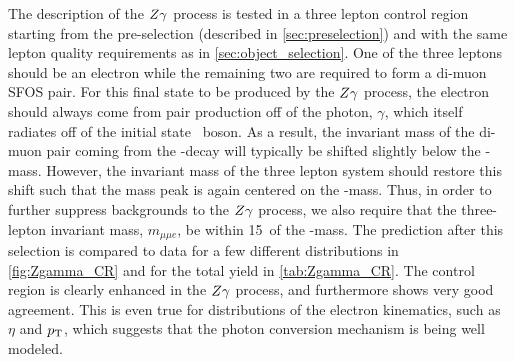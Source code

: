 The description of the $Z\gamma$ process is tested in a three lepton control
region starting from the 
pre-selection (described in \sec\ref{sec:preselection}) and with the same
lepton quality requirements as in \sec\ref{sec:object_selection}.
One of the three leptons should be an electron while the remaining two 
are required to form a di-muon SFOS pair. For this final state to be produced
by the $Z\gamma$ process, the electron should always come from 
pair production off of the photon, $\gamma$, which itself radiates
off of the initial state \z~boson.  As a result, the invariant mass
of the di-muon pair coming from the \z-decay will typically be shifted
slightly below the \z-mass. However, the invariant mass of the three lepton 
system should restore this shift such that the mass peak is again centered 
on the \z-mass. Thus, in order to further suppress backgrounds to the 
$Z\gamma$ process, we also require that the three-lepton invariant
mass, $m_{\mu\mu e}$, be within 15~\GeV of the \z-mass.
The prediction after this selection is compared to data for a few different
distributions in \fig\ref{fig:Zgamma_CR} and for the total yield
in \tab\ref{tab:Zgamma_CR}. The control region is clearly enhanced
in the $Z\gamma$ process, and furthermore shows very good agreement. 
This is even true for distributions of the electron kinematics, 
such as $\eta$ and $p_{\mathrm{T}}$, which suggests that the photon conversion
mechanism is being well modeled.

